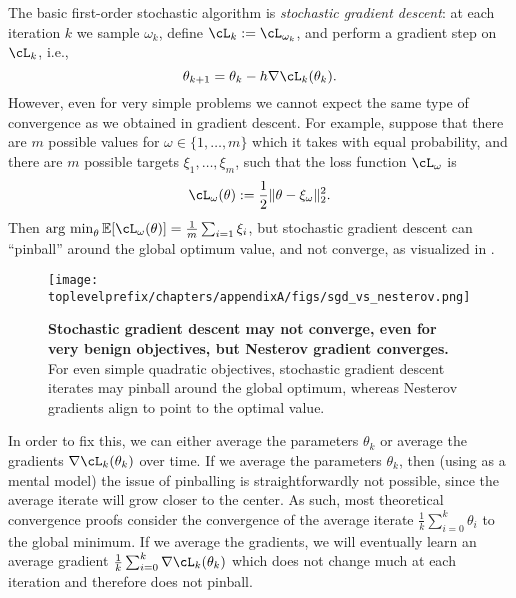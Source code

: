 \documentclass[../../book-main.tex]{subfiles}
\begin{document}
The basic first-order stochastic algorithm is \textit{stochastic gradient descent}: at each iteration \(k\) we sample \(\omega_{k}\), define \(\cL_{k} := \cL_{\omega_{k}}\), and perform a gradient step on \(\cL_{k}\), i.e.,
\begin{equation}
    \theta_{k + 1} = \theta_{k} - h\nabla \cL_{k}(\theta_{k}).
\end{equation}
However, even for very simple problems we cannot expect the same type of convergence as we obtained in gradient descent. For example, suppose that there are \(m\) possible values for \(\omega \in \{1, \dots, m\}\) which it takes with equal probability, and there are \(m\) possible targets \(\xi_{1}, \dots, \xi_{m}\), such that the loss function \(\cL_{\omega}\) is
\begin{equation}
    \cL_{\omega}(\theta) := \frac{1}{2}\norm{\theta - \xi_{\omega}}_{2}^{2}.
\end{equation}
Then \(\argmin_{\theta}\Ex[\cL_{\omega}(\theta)] = \frac{1}{m}\sum_{i = 1}\xi_{i}\), but stochastic gradient descent can ``pinball'' around the global optimum value, and not converge, as visualized in . 

\begin{figure}
    \texttt{[image: \\toplevelprefix/chapters/appendixA/figs/sgd\_vs\_nesterov.png]}
    \centering 
    \caption{\small\textbf{Stochastic gradient descent may not converge, even for very benign objectives, but Nesterov gradient converges.} For even simple quadratic objectives, stochastic gradient descent iterates may pinball around the global optimum, whereas Nesterov gradients align to point to the optimal value.}
    \label{fig:sgd_nonconvergence}
\end{figure}

In order to fix this, we can either average the parameters \(\theta_{k}\) or average the gradients \(\nabla \cL_{k}(\theta_{k})\) over time. If we average the parameters \(\theta_{k}\), then (using  as a mental model) the issue of pinballing is straightforwardly not possible, since the average iterate will grow closer to the center. As such, most theoretical convergence proofs consider the convergence of the average iterate \(\frac{1}{k}\sum_{i = 0}^{k}\theta_{i}\) to the global minimum. If we average the gradients, we will eventually learn an average gradient \(\frac{1}{k}\sum_{i = 0}^{k}\nabla \cL_{k}(\theta_{k})\) which does not change much at each iteration and therefore does not pinball.
\end{document}
